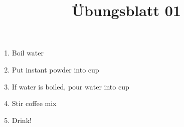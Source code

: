 \documentclass{levy}
\title{Übungsblatt 01}
\begin{document}
	
\maketitle



\begin{enumerate}[label=(\alph*)]	
	
	\item 
	Boil water
	
		
	\item 
	Put instant powder into cup
	
	\item 
	If water is boiled, pour water into cup
	
	\item 
	Stir coffee mix
	
	\item 
	Drink!		
	
\end{enumerate}










\end{document}
